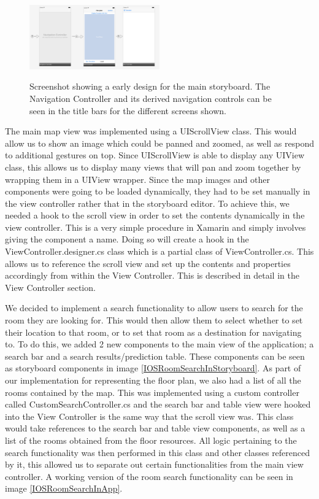 \documentclass[main.tex]{subfiles}
\begin{document}
\begin{figure}[H]
\centering
\includegraphics[width=0.5\textwidth]{images-implementation/InitialStoryboard.png}
\label{initStoryboard}
\caption{Screenshot showing a early design for the main storyboard. The Navigation Controller and its derived navigation controls can be seen in the title bars for the different screens shown.}
\end{figure}

The main map view was implemented using a UIScrollView class. This would allow us to show an image which could be panned and zoomed, as well as respond to additional gestures on top. Since UIScrollView is able to display any UIView class, this allows us to display many views that will pan and zoom together by wrapping them in a UIView wrapper. Since the map images and other components were going to be loaded dynamically, they had to be set manually in the view controller rather that in the storyboard editor. To achieve this, we needed a hook to the scroll view in order to set the contents dynamically in the view controller. This is a very simple procedure in Xamarin and simply involves giving the component a name. Doing so will create a hook in the ViewController.designer.cs class which is a partial class of ViewController.cs. This allows us to reference the scroll view and set up the contents and properties accordingly from within the View Controller. This is described in detail in the View Controller section.

We decided to implement a search functionality to allow users to search for the room they are looking for. This would then allow them to select whether to set their location to that room, or to set that room as a destination for navigating to. To do this, we added 2 new components to the main view of the application; a search bar and a search results/prediction table. These components can be seen as storyboard components in image \ref{IOSRoomSearchInStoryboard}. As part of our implementation for representing the floor plan, we also had a list of all the rooms contained by the map. This was implemented using a custom controller called CustomSearchController.cs and the search bar and table view were hooked into the View Controller is the same way that the scroll view was. This class would take references to the search bar and table view components, as well as a list of the rooms obtained from the floor resources. All logic pertaining to the search functionality was then performed in this class and other classes referenced by it, this allowed us to separate out certain functionalities from the main view controller. A working version of the room search functionality can be seen in image \ref{IOSRoomSearchInApp}.
\end{document}

